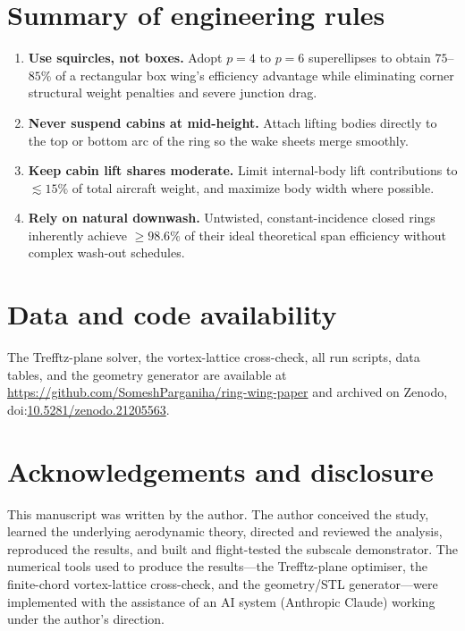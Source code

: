 \documentclass[11pt]{article}
\begin{document}
\section{Summary of engineering rules}
\begin{enumerate}
\itemsep2pt
\item \textbf{Use squircles, not boxes.} Adopt $p=4$ to $p=6$ superellipses
to obtain $75$--$85\%$ of a rectangular box wing's efficiency advantage
while eliminating corner structural weight penalties and severe junction
drag.
\item \textbf{Never suspend cabins at mid-height.} Attach lifting bodies
directly to the top or bottom arc of the ring so the wake sheets merge
smoothly.
\item \textbf{Keep cabin lift shares moderate.} Limit internal-body lift
contributions to $\lesssim15\%$ of total aircraft weight, and maximize body
width where possible.
\item \textbf{Rely on natural downwash.} Untwisted, constant-incidence
closed rings inherently achieve $\geq98.6\%$ of their ideal theoretical span
efficiency without complex wash-out schedules.
\end{enumerate}

\section*{Data and code availability}
The Trefftz-plane solver, the vortex-lattice cross-check, all run scripts,
data tables, and the geometry generator are available at
\url{https://github.com/SomeshParganiha/ring-wing-paper} and archived on
Zenodo, doi:\href{https://doi.org/10.5281/zenodo.21205563}{10.5281/zenodo.21205563}.

\section*{Acknowledgements and disclosure}
This manuscript was written by the author. The author conceived the study,
learned the underlying aerodynamic theory, directed and reviewed the
analysis, reproduced the results, and built and flight-tested the subscale
demonstrator. The numerical tools used to produce the results---the
Trefftz-plane optimiser, the finite-chord vortex-lattice cross-check, and
the geometry/STL generator---were implemented with the assistance of an AI
system (Anthropic Claude) working under the author's direction.
\end{document}
